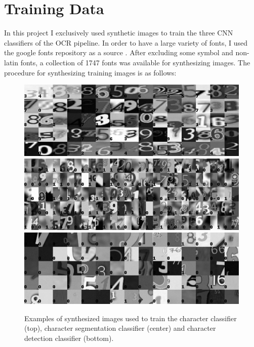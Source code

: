\documentclass[12pt]{article}
\begin{document}
\section{Training Data}
In this project I exclusively used synthetic images to train the three CNN classifiers
of the OCR pipeline. In order to have a large variety of fonts,
I used the google fonts repository as a source \cite{googlefo53:online}. After excluding some
symbol and non-latin fonts, a collection of 1747 fonts was available for synthesizing images.
The procedure for synthesizing training images is as follows:

\begin{figure}[ht!]
  \centering
  \includegraphics[width=1.0\linewidth]{fig/training_example_images/classifier}
  \includegraphics[width=1.0\linewidth]{fig/training_example_images/segmentation}
  \includegraphics[width=1.0\linewidth]{fig/training_example_images/detection}
  \caption
  {
    Examples of synthesized images used to train the character classifier (top),
    character segmentation classifier (center) and character detection classifier (bottom).
  }
  \label{fig:training_images}
\end{figure}
\end{document}

